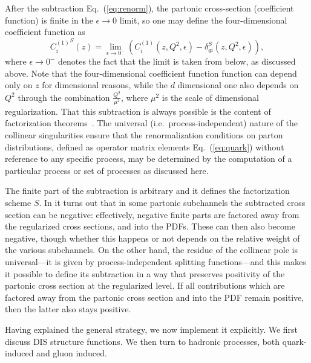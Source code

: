 After the subtraction Eq.~(\ref{eq:renorm}), the partonic cross-section
(coefficient function) is
finite in the $\epsilon\to0$ limit, so one may define the
four-dimensional coefficient function as
\begin{equation}\label{eq:crenorm}
    {C^{(1)}_{i}}^S(z) = \lim_{\epsilon\to0^-}\left( {C^{(1)}_{i}}(z,Q^2,\epsilon)
    -\delta_{qi}^S(z,Q^2,\epsilon)\right),
\end{equation}
where $\epsilon\to 0^-$ denotes the fact that the limit is taken from
below, as discussed above. Note that the four-dimensional coefficient
function function can depend only on $z$ for dimensional reasons,
while the $d$ dimensional one  also depends on $Q^2$ through the
combination $\frac{Q^2}{\mu^2}$, where $\mu^2$ is the scale of
dimensional regularization. That this subtraction is always possible
is the content of factorization
theorems~\cite{Collins:2011zzd,Curci:1980uw}. The universal
(i.e.\ process-independent) nature of the collinear singularities
ensure that the renormalization conditions on parton distributions,
defined as operator matrix elements Eq.~(\ref{eq:quark})
without reference to any specific
process, may be determined by the computation of a particular process
or set of processes as discussed here.

The finite part of the
subtraction is arbitrary and it defines the factorization scheme $S$. In
\msbar{} it turns out that in some partonic subchannels the
subtracted cross section can be negative:
effectively, negative finite parts are factored away from the
regularized cross sections, and into the PDFs. These can then
also become negative, though whether this happens or not depends on
the relative weight of the various subchannels.
On the other hand, the residue of
the collinear pole is universal---it is given by
process-independent splitting functions---and this makes it possible
to define its subtraction in a way that preserves positivity of the
partonic cross section at the regularized level. If all contributions
which are factored away from the partonic cross section and into the
PDF remain positive, then the latter also stays positive.


Having explained the general strategy, we now implement it
explicitly. 
We first discuss DIS structure functions.
We  then turn to hadronic processes, both quark-induced and gluon induced.


